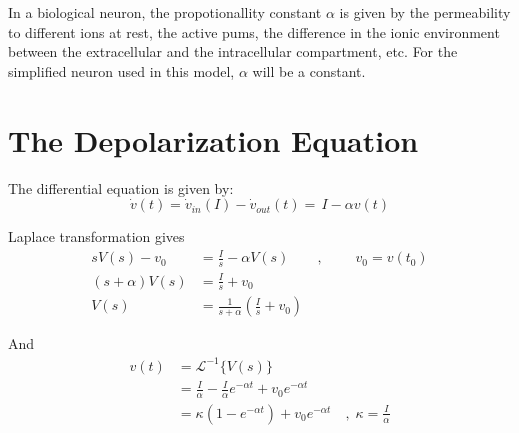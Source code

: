 In a biological neuron, the propotionallity constant $\alpha$ is given by 
	the permeability to different ions at rest, 
	the active pums, 
	the difference in the ionic environment between the extracellular and the intracellular compartment, 
	etc.
For the simplified neuron used in this model, $\alpha$ will be a constant. %


\section{The Depolarization Equation}%
The differential equation is given by:
\begin{equation}
	\dot{v}(t) = \dot{v}_{in}(I) - \dot{v}_{out}(t) = \, I - \alpha v(t)
\end{equation}

Laplace transformation gives
\begin{equation}
	\begin{split}
		sV(s)-v_0 		&= \frac{I}{s} - \alpha V(s) 			\qquad, \; \qquad v_0 = v(t_0) 				\\
		(s+\alpha)V(s) 	&= \frac{I}{s} + v_0 														\\
		V(s) 			&= \frac{1}{s+\alpha}\left( \frac{I}{s} + v_0 \right)
	\end{split}
\end{equation}

And 
\begin{equation}
	\begin{split}
		v(t)  	&= 		\mathscr{L}^{-1}\bigg\{ V(s) \bigg\}  									\\
		 		&=		\frac{I}{\alpha} - \frac{I}{\alpha} e^{-\alpha t} + v_0 e^{-\alpha t} 	\\
				&= 		\kappa \left( 1 - e^{-\alpha t} \right) + v_0 e^{-\alpha t} 	\quad,\; \kappa = \frac{I}{\alpha} 
		\label{eqVerdiligninga}
	\end{split}
\end{equation}

